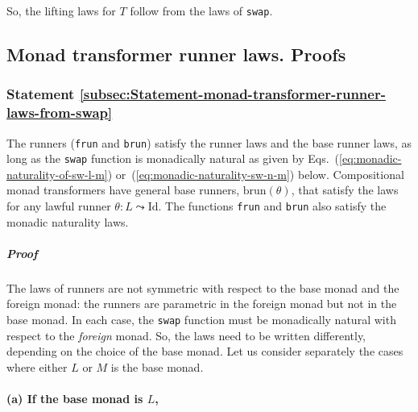 So, the lifting laws for $T$ follow from the laws of \lstinline!swap!.

\subsection{Monad transformer runner laws. Proofs}

\subsubsection{Statement \label{subsec:Statement-monad-transformer-runner-laws-from-swap}\ref{subsec:Statement-monad-transformer-runner-laws-from-swap}}

The runners (\lstinline!frun! and \lstinline!brun!) satisfy the
runner laws and the base runner laws, as long as the \lstinline!swap!
function is monadically natural as given by Eqs.~(\ref{eq:monadic-naturality-of-sw-l-m})
or~(\ref{eq:monadic-naturality-sw-n-m}) below. Compositional monad
transformers have general base runners, $\text{brun}\left(\theta\right)$,
that satisfy the laws for any lawful runner $\theta:L\leadsto\text{Id}$.
The functions \lstinline!frun! and \lstinline!brun! also satisfy
the monadic naturality laws.

\subparagraph{Proof}

The laws of runners are not symmetric with respect to the base monad
and the foreign monad: the runners are parametric in the foreign monad
but not in the base monad. In each case, the \lstinline!swap! function
must be monadically natural with respect to the \emph{foreign} monad.
So, the laws need to be written differently, depending on the choice
of the base monad. Let us consider separately the cases where either
$L$ or $M$ is the base monad.

\paragraph{(a) If the base monad is $L$, }

